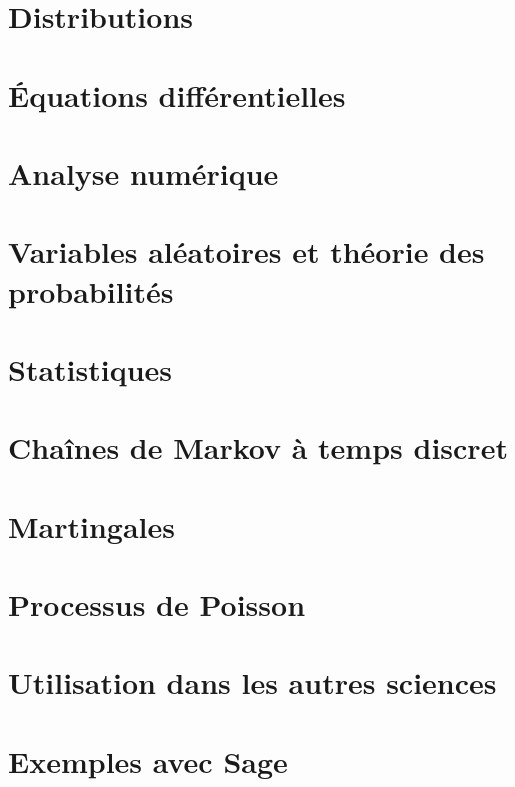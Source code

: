 \chapter{Distributions}


\chapter{Équations différentielles}




\chapter{Analyse numérique}



\chapter{Variables aléatoires et théorie des probabilités}




\chapter{Statistiques}


\chapter{Chaînes de Markov à temps discret}


\chapter{Martingales}


\chapter{Processus de Poisson}


\chapter{Utilisation dans les autres sciences}



\chapter{Exemples avec Sage}


